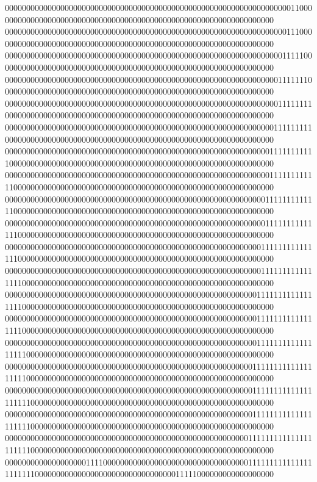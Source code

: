 000000000000000000000000000000000000000000000000000000000000000000011000000000000000000000000000000000000000000000000000000000000000000
000000000000000000000000000000000000000000000000000000000000000000111000000000000000000000000000000000000000000000000000000000000000000
000000000000000000000000000000000000000000000000000000000000000001111100000000000000000000000000000000000000000000000000000000000000000
000000000000000000000000000000000000000000000000000000000000000011111110000000000000000000000000000000000000000000000000000000000000000
000000000000000000000000000000000000000000000000000000000000000011111111000000000000000000000000000000000000000000000000000000000000000
000000000000000000000000000000000000000000000000000000000000000111111111000000000000000000000000000000000000000000000000000000000000000
000000000000000000000000000000000000000000000000000000000000001111111111100000000000000000000000000000000000000000000000000000000000000
000000000000000000000000000000000000000000000000000000000000001111111111110000000000000000000000000000000000000000000000000000000000000
000000000000000000000000000000000000000000000000000000000000011111111111110000000000000000000000000000000000000000000000000000000000000
000000000000000000000000000000000000000000000000000000000000011111111111111000000000000000000000000000000000000000000000000000000000000
000000000000000000000000000000000000000000000000000000000000111111111111111000000000000000000000000000000000000000000000000000000000000
000000000000000000000000000000000000000000000000000000000000111111111111111100000000000000000000000000000000000000000000000000000000000
000000000000000000000000000000000000000000000000000000000001111111111111111100000000000000000000000000000000000000000000000000000000000
000000000000000000000000000000000000000000000000000000000001111111111111111100000000000000000000000000000000000000000000000000000000000
000000000000000000000000000000000000000000000000000000000001111111111111111110000000000000000000000000000000000000000000000000000000000
000000000000000000000000000000000000000000000000000000000011111111111111111110000000000000000000000000000000000000000000000000000000000
000000000000000000000000000000000000000000000000000000000011111111111111111111000000000000000000000000000000000000000000000000000000000
000000000000000000000000000000000000000000000000000000000011111111111111111111000000000000000000000000000000000000000000000000000000000
000000000000000000000000000000000000000000000000000000000111111111111111111111000000000000000000000000000000000000000000000000000000000
000000000000000000011110000000000000000000000000000000000111111111111111111111100000000000000000000000000000000011111000000000000000000
